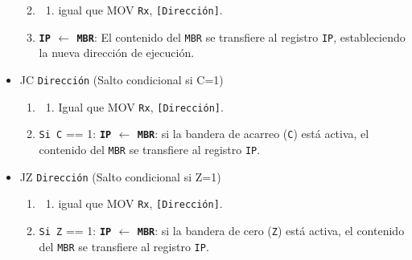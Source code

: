 \documentclass[12pt,oneside]{templates/unerthesis}
\providecommand{\tightlist}{%
  \setlength{\itemsep}{0pt}\setlength{\parskip}{0pt}}
\begin{document}
\begin{itemize}
  \begin{enumerate}
  \def\labelenumi{\arabic{enumi}.}
  \item
    \begin{enumerate}
    \def\labelenumii{\arabic{enumii}.}
    \setcounter{enumii}{1}
    \tightlist
    \item
      igual que MOV \texttt{Rx}, \texttt{{[}Dirección{]}}.
    \end{enumerate}
  \item
    \textbf{\texttt{IP} \(\leftarrow\) \texttt{MBR}}:
    El contenido del \texttt{MBR} se transfiere al registro \texttt{IP}, estableciendo la nueva dirección de ejecución.
  \end{enumerate}
\item
  JC \texttt{Dirección} (Salto condicional si C=1)

  \begin{enumerate}
  \def\labelenumi{\arabic{enumi}.}
  \item
    \begin{enumerate}
    \def\labelenumii{\arabic{enumii}.}
    \setcounter{enumii}{1}
    \tightlist
    \item
      Igual que MOV \texttt{Rx}, \texttt{{[}Dirección{]}}.
    \end{enumerate}
  \item
    \texttt{Si\ C} == 1: \textbf{\texttt{IP} \(\leftarrow\) \texttt{MBR}}:
    si la bandera de acarreo (\texttt{C}) está activa, el contenido del \texttt{MBR} se transfiere al registro \texttt{IP}.
  \end{enumerate}
\item
  JZ \texttt{Dirección} (Salto condicional si Z=1)

  \begin{enumerate}
  \def\labelenumi{\arabic{enumi}.}
  \item
    \begin{enumerate}
    \def\labelenumii{\arabic{enumii}.}
    \setcounter{enumii}{1}
    \tightlist
    \item
      igual que MOV \texttt{Rx}, \texttt{{[}Dirección{]}}.
    \end{enumerate}
  \item
    \texttt{Si\ Z} == 1: \textbf{\texttt{IP} \(\leftarrow\) \texttt{MBR}}:
    si la bandera de cero (\texttt{Z}) está activa, el contenido del \texttt{MBR} se transfiere al registro \texttt{IP}.
  \end{enumerate}
\end{itemize}
\end{document}
